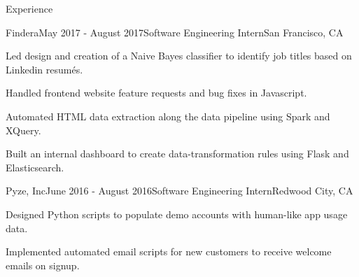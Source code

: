 \documentclass{resume}
\begin{document}
\begin{rSection}{Experience}
  
    \begin{rSubsection}{Findera}{May 2017 - August 2017}{Software Engineering Intern}{San Francisco, CA}
    \item Led design and creation of a Naive Bayes classifier to identify job titles based on Linkedin resum\'es.
    \item Handled frontend website feature requests and bug fixes in Javascript.
    \item Automated HTML data extraction along the data pipeline using Spark and XQuery.
    \item Built an internal dashboard to create data-transformation rules using Flask and Elasticsearch.
    \end{rSubsection}

    \begin{rSubsection}{Pyze, Inc}{June 2016 - August 2016}{Software Engineering Intern}{Redwood City, CA}
    \item Designed Python scripts to populate demo accounts with human-like app usage data.
    \item Implemented automated email scripts for new customers to receive welcome emails on signup.
    \end{rSubsection}

  \end{rSection}
\end{document}
